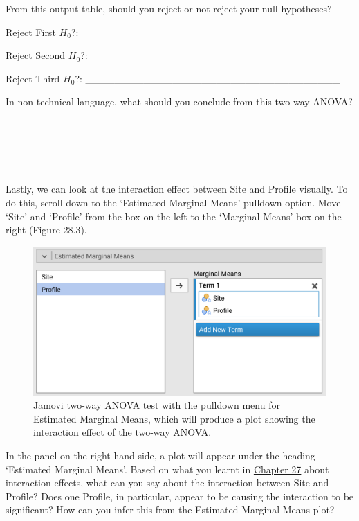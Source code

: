 \documentclass[
  openany]{krantz}
\begin{document}
From this output table, should you reject or not reject your null hypotheses?

Reject First \(H_{0}\)?: \_\_\_\_\_\_\_\_\_\_\_\_\_\_\_\_\_\_\_\_\_\_\_\_\_\_\_\_\_\_\_\_\_\_\_

Reject Second \(H_{0}\)?: \_\_\_\_\_\_\_\_\_\_\_\_\_\_\_\_\_\_\_\_\_\_\_\_\_\_\_\_\_\_\_\_\_\_\_

Reject Third \(H_{0}\)?: \_\_\_\_\_\_\_\_\_\_\_\_\_\_\_\_\_\_\_\_\_\_\_\_\_\_\_\_\_\_\_\_\_\_\_

In non-technical language, what should you conclude from this two-way ANOVA?

\begin{verbatim}





\end{verbatim}

Lastly, we can look at the interaction effect between Site and Profile visually.
To do this, scroll down to the `Estimated Marginal Means' pulldown option.
Move `Site' and `Profile' from the box on the left to the `Marginal Means' box on the right (Figure 28.3).

\begin{figure}
\includegraphics[width=1\linewidth]{img/jamovi_marginal_means} \caption{Jamovi two-way ANOVA test with the pulldown menu for Estimated Marginal Means, which will produce a plot showing the interaction effect of the two-way ANOVA.}\label{fig:unnamed-chunk-116}
\end{figure}

In the panel on the right hand side, a plot will appear under the heading `Estimated Marginal Means'.
Based on what you learnt in \protect\hyperlink{Chapter_27}{Chapter 27} about interaction effects, what can you say about the interaction between Site and Profile?
Does one Profile, in particular, appear to be causing the interaction to be significant?
How can you infer this from the Estimated Marginal Means plot?
\end{document}
